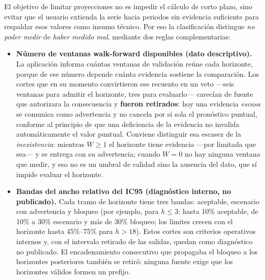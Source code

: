 \documentclass[12pt,letterpaper]{article}
\begin{document}
El objetivo de limitar proyecciones no es impedir el cálculo de corto plazo, sino evitar que el usuario extienda la serie hacia periodos sin evidencia suficiente para respaldar esos valores como insumo técnico. Por eso la clasificación distingue \emph{no poder medir} de \emph{haber medido mal}, mediante dos reglas complementarias:

\begin{itemize}
    \item \textbf{Número de ventanas walk-forward disponibles (dato descriptivo).} La aplicación informa cuántas ventanas de validación reúne cada horizonte, porque de ese número depende cuánta evidencia sostiene la comparación. Los cortes que en su momento convirtieron ese recuento en un veto ---seis ventanas para admitir el horizonte, tres para evaluarlo--- carecían de fuente que autorizara la consecuencia y \textbf{fueron retirados}: hoy una evidencia \emph{escasa} se comunica como advertencia y no cancela por sí sola el pronóstico puntual, conforme al principio de que una deficiencia de la evidencia no invalida automáticamente el valor puntual. Conviene distinguir esa escasez de la \emph{inexistencia}: mientras $W \geq 1$ el horizonte tiene evidencia ---por limitada que sea--- y se entrega con su advertencia; cuando $W = 0$ no hay ninguna ventana que medir, y eso no es un umbral de calidad sino la ausencia del dato, que sí impide evaluar el horizonte.
    \item \textbf{Bandas del ancho relativo del IC95 (diagnóstico interno, no publicado).} Cada tramo de horizonte tiene tres bandas: aceptable, escenario con advertencia y bloqueo (por ejemplo, para \(h\leq3\): hasta 10\% aceptable, de 10\% a 30\% escenario y más de 30\% bloqueo; los límites crecen con el horizonte hasta 45\%--75\% para \(h>18\)). Estos cortes son criterios operativos internos y, con el intervalo retirado de las salidas, quedan como diagnóstico no publicado. El encadenamiento consecutivo que propagaba el bloqueo a los horizontes posteriores también se retiró: ninguna fuente exige que los horizontes válidos formen un prefijo.
\end{itemize}
\end{document}
